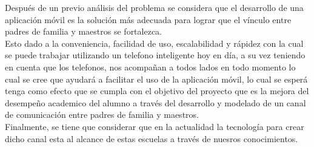         Después de un previo análisis del problema se considera que el desarrollo de una aplicación móvil es la solución más adecuada para lograr que el vínculo entre padres de familia y maestros se fortalezca. \\ Esto dado a la conveniencia, facilidad de uso, escalabilidad y rápidez con la cual se puede trabajar utilizando un telefono inteligente hoy en día, a su vez teniendo en cuenta que los telefonos, nos acompañan a todos lados en todo momento lo cual se cree que ayudará a facilitar el uso de la aplicación móvil, lo cual se esperá tenga como efecto que se cumpla con el objetivo del proyecto que es la mejora del desempeño academico del alumno a través del desarrollo y modelado de un canal de comunicación entre padres de familia y maestros. \\ Finalmente, se tiene que considerar que en la actualidad la tecnología para crear dicho canal esta al alcance de estas escuelas a través de nuesros conocimientos.